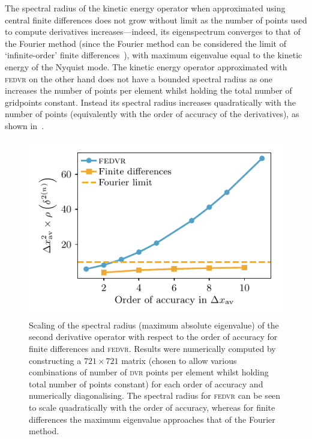The spectral radius of the kinetic energy operator when approximated using central finite differences does not grow without limit as the number of points used to compute derivatives increases---indeed, its eigenspectrum converges to that of the Fourier method (since the Fourier method can be considered the limit of `infinite-order' finite differences~\cite{fornberg_pseudospectral_1987}), with maximum eigenvalue equal to the kinetic energy of the Nyquist mode. The kinetic energy operator approximated with \textsc{fedvr} on the other hand does not have a bounded spectral radius as one increases the number of points per element whilst holding the total number of gridpoints constant. Instead its spectral radius increases quadratically with the number of points (equivalently with the order of accuracy of the derivatives), as shown in~.

\begin{figure}[t]
    \centerfloat
    \includegraphics{figures/numerics/fedvr_eigenvalue_scaling.pdf}
    \caption{Scaling of the spectral radius (maximum absolute eigenvalue) of the second derivative operator with respect to the order of accuracy for finite differences and \textsc{fedvr}. Results were numerically computed by constructing a $721\times721$ matrix (chosen to allow various combinations of number of \textsc{dvr} points per element whilst holding total number of points constant) for each order of accuracy and numerically diagonalising. The spectral radius for \textsc{fedvr} can be seen to scale quadratically with the order of accuracy, whereas for finite differences the maximum eigenvalue approaches that of the Fourier method.}
    \label{fig:fedvr_eigenvalue_scaling}
\end{figure}

